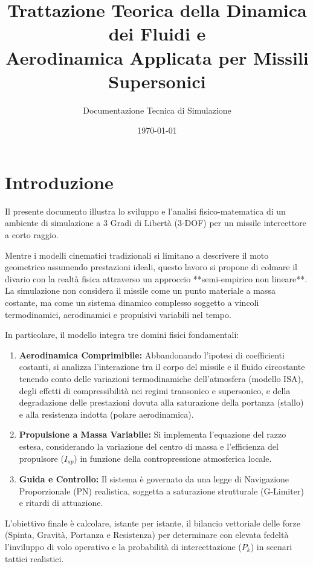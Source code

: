 \documentclass[12pt,a4paper]{article}
\title{\textbf{Trattazione Teorica della Dinamica dei Fluidi e \\ Aerodinamica Applicata per Missili Supersonici}}
\author{Documentazione Tecnica di Simulazione}
\date{\today}
\begin{document}
\maketitle
\tableofcontents
\newpage


\section{Introduzione}

 Il presente documento illustra lo sviluppo e l'analisi fisico-matematica di un ambiente di simulazione a 3 Gradi di Libertà (3-DOF) per un missile intercettore a corto raggio.

Mentre i modelli cinematici tradizionali si limitano a descrivere il moto geometrico assumendo prestazioni ideali, questo lavoro si propone di colmare il divario con la realtà fisica attraverso un approccio **semi-empirico non lineare**. La simulazione non considera il missile come un punto materiale a massa costante, ma come un sistema dinamico complesso soggetto a vincoli termodinamici, aerodinamici e propulsivi variabili nel tempo.

In particolare, il modello integra tre domini fisici fondamentali:
\begin{enumerate}
    \item \textbf{Aerodinamica Comprimibile:} Abbandonando l'ipotesi di coefficienti costanti, si analizza l'interazione tra il corpo del missile e il fluido circostante tenendo conto delle variazioni termodinamiche dell'atmosfera (modello ISA), degli effetti di compressibilità nei regimi transonico e supersonico, e della degradazione delle prestazioni dovuta alla saturazione della portanza (stallo) e alla resistenza indotta (polare aerodinamica).
    \item \textbf{Propulsione a Massa Variabile:} Si implementa l'equazione del razzo estesa, considerando la variazione del centro di massa e l'efficienza del propulsore ($I_{sp}$) in funzione della contropressione atmosferica locale.
    \item \textbf{Guida e Controllo:} Il sistema è governato da una legge di Navigazione Proporzionale (PN) realistica, soggetta a saturazione strutturale (G-Limiter) e ritardi di attuazione.
\end{enumerate}

L'obiettivo finale è calcolare, istante per istante, il bilancio vettoriale delle forze (Spinta, Gravità, Portanza e Resistenza) per determinare con elevata fedeltà l'inviluppo di volo operativo e la probabilità di intercettazione ($P_k$) in scenari tattici realistici.
\end{document}
